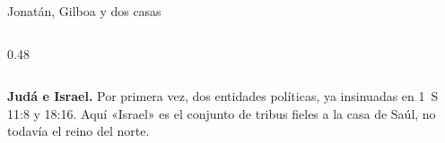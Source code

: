 \begin{frame}{Jonatán, Gilboa y dos casas}
\begin{columns}[T,onlytextwidth]
\begin{column}{0.48\textwidth}
\elabpropia
\end{column}
\end{columns}
\vspace{4pt}
\begin{clave}
\textbf{Judá e Israel.} Por primera vez, dos entidades políticas, ya insinuadas en 1~S 11:8 y 18:16. Aquí «Israel» es el conjunto de tribus fieles a la casa de Saúl, no todavía el reino del norte.
\end{clave}
\end{frame}


